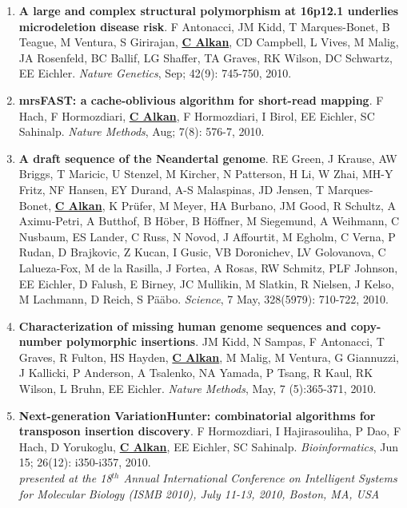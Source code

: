 \begin{enumerate}
\item
{\bf A large and complex structural polymorphism at 16p12.1 underlies microdeletion disease risk}. F Antonacci, JM Kidd,
 T Marques-Bonet, B Teague, M Ventura, S Girirajan, {\bf {\underline {C Alkan}}}, CD Campbell, L Vives, M Malig, 
JA Rosenfeld, BC Ballif, LG Shaffer, TA Graves, RK Wilson, DC Schwartz, EE Eichler. {\em Nature 
Genetics}, Sep;  42(9): 745-750, 2010.

\item
{\bf mrsFAST: a cache-oblivious algorithm for short-read mapping}. F  Hach,  F Hormozdiari, {\bf {\underline {C Alkan}}}, F Hormozdiari,
 I Birol,  EE Eichler, SC Sahinalp. {\em Nature Methods}, Aug;  7(8): 576-7, 2010.

\item
 {\bf A draft sequence of the Neandertal genome}. RE Green, J Krause, 
AW Briggs, T Maricic, U Stenzel, M Kircher, N Patterson, 
H Li, W Zhai, MH-Y Fritz, NF Hansen, EY Durand, 
A-S Malaspinas, JD Jensen, T Marques-Bonet, {\bf {\underline {C Alkan}}}, K Pr\"{u}fer, M Meyer, HA Burbano, JM Good, R Schultz, A Aximu-Petri, 
A Butthof, B H\"{o}ber, B H\"{o}ffner, M Siegemund, A Weihmann, C
Nusbaum, ES Lander, C Russ, N Novod, J Affourtit, M Egholm, 
C Verna, P Rudan, D Brajkovic, Z Kucan, I Gusic, VB 
Doronichev, LV Golovanova, C Lalueza-Fox, M de la Rasilla, J Fortea, 
A Rosas, RW Schmitz, PLF Johnson, EE Eichler, D Falush, E 
Birney, JC Mullikin, M Slatkin, R Nielsen, J Kelso, M Lachmann, 
D Reich, S P\"{a}\"{a}bo. {\em Science}, 7 May, 328(5979): 710-722, 2010. \\


\item
{\bf Characterization of missing human genome sequences and
copy-number polymorphic insertions}.
JM Kidd, N Sampas, F Antonacci, T Graves, R Fulton, HS Hayden, {\bf {\underline{C Alkan}}},
 M Malig, M Ventura, G Giannuzzi, J Kallicki, P Anderson, A Tsalenko, 
NA Yamada, P Tsang, R Kaul, RK Wilson, L Bruhn, EE Eichler.
{\em Nature Methods}, May, 7 (5):365-371, 2010.


\item
{\bf Next-generation VariationHunter: combinatorial algorithms for transposon insertion discovery}.
F Hormozdiari, I Hajirasouliha, P Dao, F Hach, D Yorukoglu, {\bf {\underline{C Alkan}}},
 EE Eichler, SC Sahinalp.
{\em Bioinformatics}, Jun 15;  26(12): i350-i357, 2010. \\
\hspace*{1cm} {\footnotesize {\em presented at the 18$^{th}$ Annual International Conference on Intelligent Systems
for Molecular Biology (ISMB 2010), July 11-13, 2010, Boston, MA, USA}}




\end{enumerate}
